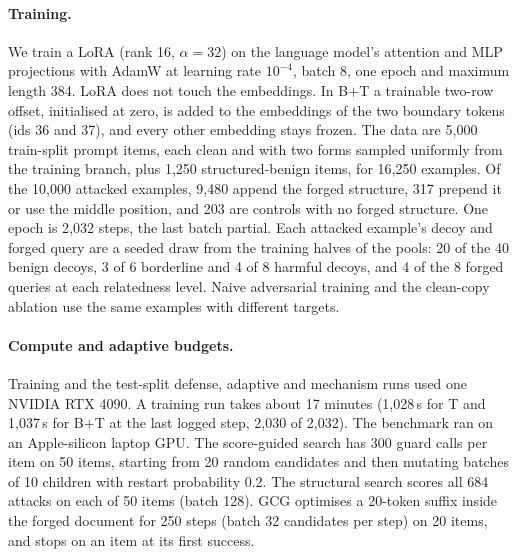 \paragraph{Training.}
We train a LoRA (rank 16, $\alpha=32$) on the language model's attention and MLP projections with AdamW at learning rate $10^{-4}$, batch 8, one epoch and maximum length 384. LoRA does not touch the embeddings. In B$+$T a trainable two-row offset, initialised at zero, is added to the embeddings of the two boundary tokens (ids 36 and 37), and every other embedding stays frozen. %
The data are 5{,}000 train-split prompt items, each clean and with two forms sampled uniformly from the training branch, plus 1{,}250 structured-benign items, for 16{,}250 examples. Of the 10{,}000 attacked examples, 9{,}480 append the forged structure, 317 prepend it or use the middle position, and 203 are controls with no forged structure. %
 One epoch is 2{,}032 steps, the last batch partial. Each attacked example's decoy and forged query are a seeded draw from the training halves of the pools: 20 of the 40 benign decoys, 3 of 6 borderline and 4 of 8 harmful decoys, and 4 of the 8 forged queries at each relatedness level. %
Naive adversarial training and the clean-copy ablation use the same examples with different targets.

\paragraph{Compute and adaptive budgets.}
Training and the test-split defense, adaptive and mechanism runs used one NVIDIA RTX 4090. A training run takes about 17 minutes (1{,}028\,s for T and 1{,}037\,s for B$+$T at the last logged step, 2{,}030 of 2{,}032). The benchmark ran on an Apple-silicon laptop GPU. %
The score-guided search has 300 guard calls per item on 50 items, starting from 20 random candidates and then mutating batches of 10 children with restart probability 0.2. The structural search scores all 684 attacks on each of 50 items (batch 128). GCG optimises a 20-token suffix inside the forged document for 250 steps (batch 32 candidates per step) on 20 items, and stops on an item at its first success. %

